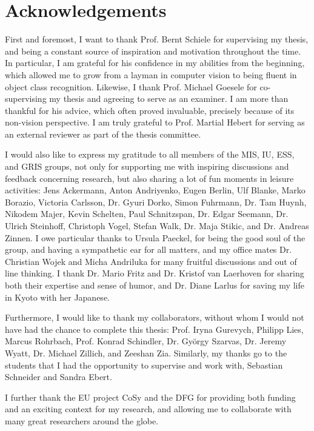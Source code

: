 \thispagestyle{plain}
\chapter*{\Huge Acknowledgements}
First and foremost, I want to thank Prof. Bernt Schiele for
supervising my thesis, and being a constant source of inspiration and
motivation throughout the time. In particular, I am grateful for his
confidence in my abilities from the beginning, which allowed me to
grow from a layman in computer vision to being fluent in object class
recognition.
Likewise, I thank Prof. Michael Goesele for
co-supervising my thesis and agreeing to serve as an examiner. I am
more than thankful for his advice, which often proved invaluable, precisely
because of its non-vision perspective.
I am truly grateful to Prof. Martial Hebert for serving as an
external reviewer as part of the thesis committee.

I would also like to express my gratitude to all members of the MIS,
IU, ESS, and GRIS groups, not only for supporting me with inspiring
discussions and feedback concerning research, but also sharing a lot
of fun moments in leisure activities: Jens Ackermann, Anton Andriyenko, Eugen Berlin,
Ulf Blanke, Marko Borazio, Victoria Carlsson, Dr. Gyuri Dorko, Simon
Fuhrmann, Dr. Tam Huynh,
Nikodem Majer, Kevin Schelten, Paul Schnitzspan, Dr. Edgar Seemann,
Dr. Ulrich Steinhoff, Christoph Vogel,
Stefan Walk, Dr. Maja Stikic, and Dr. Andreas Zinnen. I owe particular
thanks to Ursula
Paeckel, for being the good soul of the group, and having a
sympathetic ear for all matters, and my office mates Dr. Christian Wojek
and Micha Andriluka for many fruitful discussions and out of line
thinking. I thank Dr. Mario Fritz and Dr. Kristof van Laerhoven for
sharing both their expertise and sense of humor, and Dr. Diane Larlus
for saving my life in Kyoto with her Japanese.

Furthermore, I would like to thank my collaborators, without whom I
would not have had the chance to complete this thesis:
Prof. Iryna Gurevych,
Philipp Lies,
Marcus Rohrbach,
Prof. Konrad Schindler,
Dr. Gy{\"o}rgy Szarvas,
Dr. Jeremy Wyatt,
Dr. Michael Zillich,
and Zeeshan Zia. Similarly, my thanks go to the students that I had
the opportunity to supervise and work with, Sebastian Schneider and
Sandra Ebert.

I further thank the EU project CoSy and the DFG for providing both
funding and an exciting context for my research, and allowing me to
collaborate with many great researchers around the globe.


